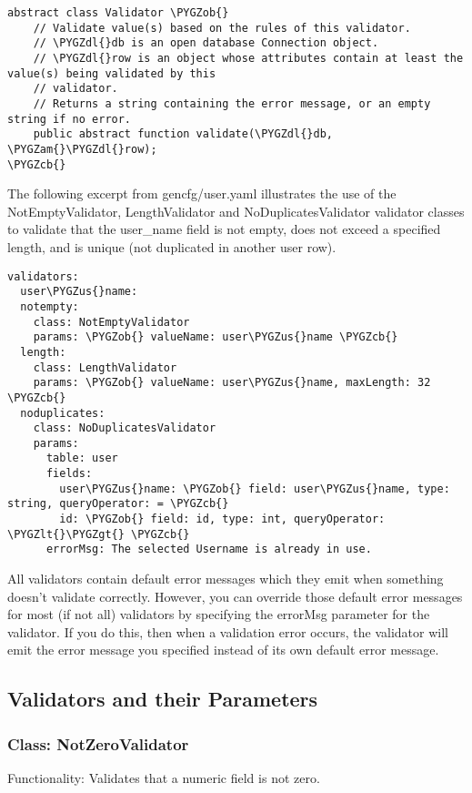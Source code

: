 \documentclass[letterpaper,10pt,english]{sphinxmanual}
\def\PYGZus{\char`\_}
\def\PYGZob{\char`\{}
\def\PYGZcb{\char`\}}
\def\PYGZam{\char`\&}
\def\PYGZlt{\char`\<}
\def\PYGZgt{\char`\>}
\def\PYGZdl{\char`\$}
\begin{document}
\begin{Verbatim}[commandchars=\\\{\}]
abstract class Validator \PYGZob{}
    // Validate value(s) based on the rules of this validator.
    // \PYGZdl{}db is an open database Connection object.
    // \PYGZdl{}row is an object whose attributes contain at least the value(s) being validated by this
    // validator.
    // Returns a string containing the error message, or an empty string if no error.
    public abstract function validate(\PYGZdl{}db, \PYGZam{}\PYGZdl{}row);
\PYGZcb{}
\end{Verbatim}

The following excerpt from gencfg/user.yaml illustrates the use of the NotEmptyValidator,
LengthValidator and NoDuplicatesValidator validator classes to validate that the user\_name field is
not empty, does not exceed a specified length, and is unique (not duplicated in another user row).

\begin{Verbatim}[commandchars=\\\{\}]
validators:
  user\PYGZus{}name:
  notempty:
    class: NotEmptyValidator
    params: \PYGZob{} valueName: user\PYGZus{}name \PYGZcb{}
  length:
    class: LengthValidator
    params: \PYGZob{} valueName: user\PYGZus{}name, maxLength: 32 \PYGZcb{}
  noduplicates:
    class: NoDuplicatesValidator
    params:
      table: user
      fields:
        user\PYGZus{}name: \PYGZob{} field: user\PYGZus{}name, type: string, queryOperator: = \PYGZcb{}
        id: \PYGZob{} field: id, type: int, queryOperator: \PYGZlt{}\PYGZgt{} \PYGZcb{}
      errorMsg: The selected Username is already in use.
\end{Verbatim}

All validators contain default error messages which they emit when something doesn't validate
correctly.  However, you can override those default error messages for most (if not all) validators
by specifying the errorMsg parameter for the validator.  If you do this, then when a validation
error occurs, the validator will emit the error message you specified instead of its own default
error message.


\subsection{Validators and their Parameters}
\label{jaxFrameworkGuide:validators-and-their-parameters}

\subsubsection{Class: NotZeroValidator}
\label{jaxFrameworkGuide:class-notzerovalidator}
Functionality: Validates that a numeric field is not zero.
\end{document}

